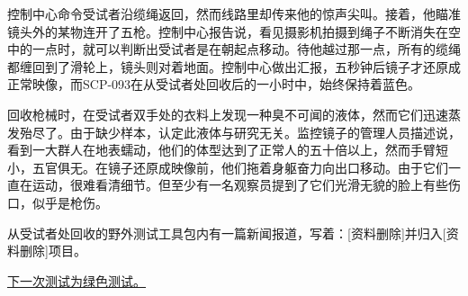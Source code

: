 \begin{scpbox}
控制中心命令受试者沿缆绳返回，然而线路里却传来他的惊声尖叫。接着，他瞄准镜头外的某物连开了五枪。控制中心报告说，看见摄影机拍摄到绳子不断消失在空中的一点时，就可以判断出受试者是在朝起点移动。待他越过那一点，所有的缆绳都缠回到了滑轮上，镜头则对着地面。控制中心做出汇报，五秒钟后镜子才还原成正常映像，而SCP-093在从受试者处回收后的一小时中，始终保持着蓝色。

回收枪械时，在受试者双手处的衣料上发现一种臭不可闻的液体，然而它们迅速蒸发殆尽了。由于缺少样本，认定此液体与研究无关。监控镜子的管理人员描述说，看到一大群人在地表蠕动，他们的体型达到了正常人的五十倍以上，然而手臂短小，五官俱无。在镜子还原成映像前，他们拖着身躯奋力向出口移动。由于它们一直在运动，很难看清细节。但至少有一名观察员提到了它们光滑无貌的脸上有些伤口，似乎是枪伤。

从受试者处回收的野外测试工具包内有一篇新闻报道，写着：{[}资料删除]并归入{[}资料删除]项目。

\end{scpbox}

\hyperref[sec:DOC-scp-093-green-test]{下一次测试为绿色测试。}
